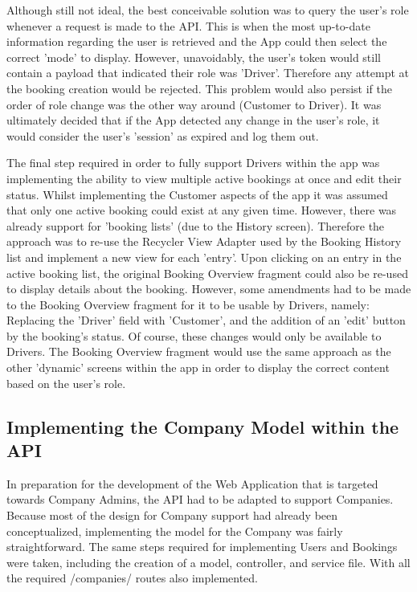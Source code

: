 Although still not ideal, the best conceivable solution was to query the user's role whenever a request is made to the API. This is when the most up-to-date information regarding the user is retrieved and the App could then select the correct 'mode' to display. However, unavoidably, the user's token would still contain a payload that indicated their role was 'Driver'. Therefore any attempt at the booking creation would be rejected. This problem would also persist if the order of role change was the other way around (Customer to Driver). It was ultimately decided that if the App detected any change in the user's role, it would consider the user's 'session' as expired and log them out.

The final step required in order to fully support Drivers within the app was implementing the ability to view multiple active bookings at once and edit their status. Whilst implementing the Customer aspects of the app it was assumed that only one active booking could exist at any given time. However, there was already support for 'booking lists' (due to the History screen). Therefore the approach was to re-use the Recycler View Adapter used by the Booking History list and implement a new view for each 'entry'. Upon clicking on an entry in the active booking list, the original Booking Overview fragment could also be re-used to display details about the booking. However, some amendments had to be made to the Booking Overview fragment for it to be usable by Drivers, namely: Replacing the 'Driver' field with 'Customer', and the addition of an 'edit' button by the booking's status. Of course, these changes would only be available to Drivers. The Booking Overview fragment would use the same approach as the other 'dynamic' screens within the app in order to display the correct content based on the user's role.

\subsection{Implementing the Company Model within the API}
In preparation for the development of the Web Application that is targeted towards Company Admins, the API had to be adapted to support Companies. Because most of the design for Company support had already been conceptualized, implementing the model for the Company was fairly straightforward. The same steps required for implementing Users and Bookings were taken, including the creation of a model, controller, and service file. With all the required /companies/ routes also implemented.

